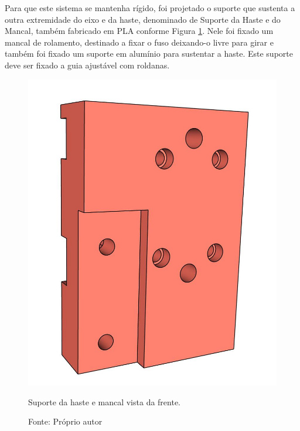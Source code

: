 \pagebreak

Para que este sistema se mantenha rígido, foi projetado o suporte que sustenta a outra 
extremidade do eixo e da haste, denominado de Suporte da Haste e do Mancal, também 
fabricado em \ac{PLA} conforme Figura \ref{fig:ressuportehastemancalf}. Nele foi fixado um 
mancal de rolamento, destinado a fixar o fuso deixando-o livre para girar e também foi 
fixado um suporte em alumínio para sustentar a haste. Este suporte deve ser fixado a 
guia ajustável com roldanas.

\begin{figure}[H]
\centering
\includegraphics[scale = 0.4]{figuras/ressuportehastemancalf}
\caption{Suporte da haste e mancal vista da frente.}
\caption*{Fonte: Próprio autor}
\label{fig:ressuportehastemancalf}
\end{figure}
    
